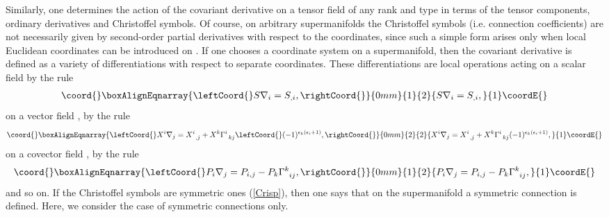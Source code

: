 \documentclass[a4paper,11pt]{article}
\begin{document}
Similarly, one determines the action of the covariant derivative on a tensor
field of any rank and type in terms of the tensor components, ordinary
derivatives and Christoffel symbols. Of course, on arbitrary supermanifolds \coordHE{} the Christoffel symbols (i.e. connection coefficients) are not
necessarily given by second-order partial derivatives with respect to the
coordinates, since such a simple form arises only when local Euclidean
coordinates can be introduced on \coordHE{}. If one chooses a coordinate system on
a supermanifold, then the covariant derivative \coordHE{} is defined as a variety of
differentiations with respect to separate coordinates. These
differentiations are local operations acting on a scalar field \coordHE{}
by the rule
\begin{eqnarray}\coord{}\boxAlignEqnarray{\leftCoord{}
\label{scal} S\nabla_i=S_{,i},
\rightCoord{}}{0mm}{1}{2}{
S\nabla_i=S_{,i},
}{1}\coordE{}\end{eqnarray}
on a vector field \coordHE{}, by the rule
\begin{eqnarray}\coord{}\boxAlignEqnarray{\leftCoord{}
\label{vector} X^i\nabla_j=X^i_{\;\;,j}+ X^k\Gamma^i_{\;\;kj}
\leftCoord{}(-1)^{\epsilon_k(\epsilon_i+1)},
\rightCoord{}}{0mm}{2}{2}{
X^i\nabla_j=X^i_{\;\;,j}+ X^k\Gamma^i_{\;\;kj}
(-1)^{\epsilon_k(\epsilon_i+1)},
}{1}\coordE{}\end{eqnarray}
on a covector field \coordHE{}, by the rule
\begin{eqnarray}\coord{}\boxAlignEqnarray{\leftCoord{}
P_i\nabla_j=P_{i,j}-P_k\Gamma^k_{\;\;ij},
\rightCoord{}}{0mm}{1}{2}{
P_i\nabla_j=P_{i,j}-P_k\Gamma^k_{\;\;ij},
}{1}\coordE{}\end{eqnarray}
and so on. If the Christoffel symbols are symmetric ones (\ref{Crisp}), then
one says that on the supermanifold \coordHE{} a symmetric connection is defined.
Here, we consider the case of symmetric connections only.
\end{document}
